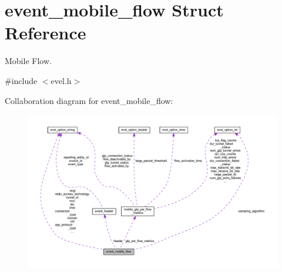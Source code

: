 \hypertarget{structevent__mobile__flow}{}\section{event\+\_\+mobile\+\_\+flow Struct Reference}
\label{structevent__mobile__flow}


Mobile Flow.  




{\ttfamily \#include $<$evel.\+h$>$}



Collaboration diagram for event\+\_\+mobile\+\_\+flow\+:
\nopagebreak
\begin{figure}[H]
\begin{center}
\leavevmode
\includegraphics[width=350pt]{structevent__mobile__flow__coll__graph}
\end{center}
\end{figure}
